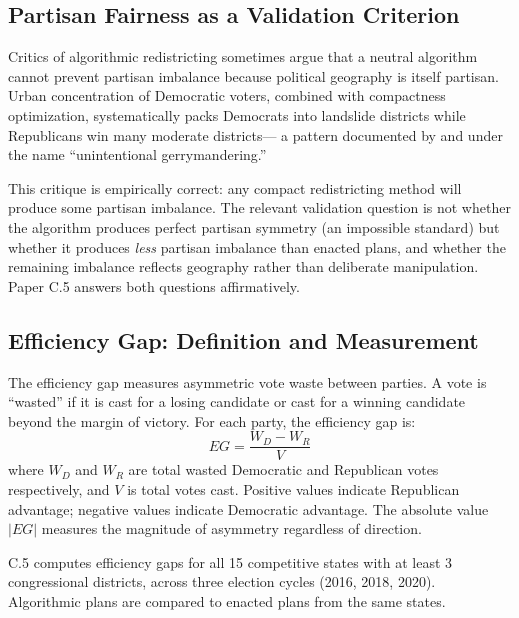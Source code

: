 
\subsection{Partisan Fairness as a Validation Criterion}

Critics of algorithmic redistricting sometimes argue that a neutral
algorithm cannot prevent partisan imbalance because political geography
is itself partisan. Urban concentration of Democratic voters, combined
with compactness optimization, systematically packs Democrats into
landslide districts while Republicans win many moderate districts---
a pattern documented by \citet{chen2013unintentional} and
\citet{rodden2019cities} under the name ``unintentional gerrymandering.''

This critique is empirically correct: any compact redistricting method
will produce some partisan imbalance. The relevant validation question
is not whether the algorithm produces perfect partisan symmetry (an
impossible standard) but whether it produces \emph{less} partisan
imbalance than enacted plans, and whether the remaining imbalance
reflects geography rather than deliberate manipulation. Paper C.5
\citep{dellalibera2026c5} answers both questions affirmatively.

\subsection{Efficiency Gap: Definition and Measurement}

The efficiency gap \citep{stephanopoulos2015partisan} measures
asymmetric vote waste between parties. A vote is ``wasted'' if it
is cast for a losing candidate or cast for a winning candidate beyond
the margin of victory. For each party, the efficiency gap is:
\begin{equation}
  EG = \frac{W_D - W_R}{V}
\end{equation}
where $W_D$ and $W_R$ are total wasted Democratic and Republican votes
respectively, and $V$ is total votes cast. Positive values indicate
Republican advantage; negative values indicate Democratic advantage.
The absolute value $|EG|$ measures the magnitude of asymmetry
regardless of direction.

C.5 computes efficiency gaps for all 15 competitive states with at
least 3 congressional districts, across three election cycles
(2016, 2018, 2020). Algorithmic plans are compared to enacted plans
from the same states.

